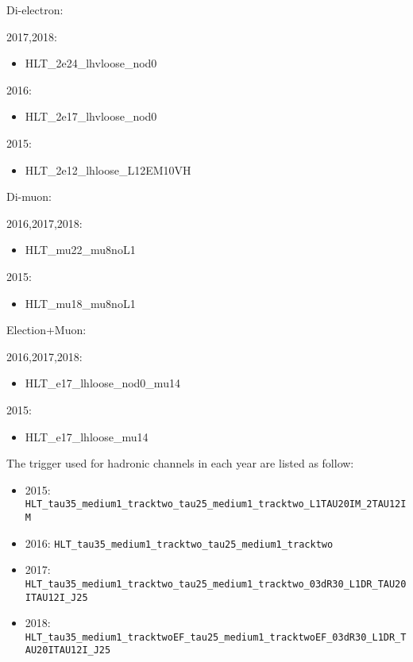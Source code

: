 Di-electron:

2017,2018:
\begin{itemize}
	\item HLT\_2e24\_lhvloose\_nod0
\end{itemize}
2016:
\begin{itemize}
	\item HLT\_2e17\_lhvloose\_nod0
\end{itemize}
2015:
\begin{itemize}
	\item HLT\_2e12\_lhloose\_L12EM10VH
\end{itemize}

Di-muon:

2016,2017,2018:
\begin{itemize}
	\item HLT\_mu22\_mu8noL1
\end{itemize}
2015:
\begin{itemize}
	\item HLT\_mu18\_mu8noL1
\end{itemize}

Election+Muon:

2016,2017,2018:
\begin{itemize}
	\item HLT\_e17\_lhloose\_nod0\_mu14
\end{itemize}
2015:
\begin{itemize}
	\item HLT\_e17\_lhloose\_mu14
\end{itemize}

The trigger used for hadronic channels in each year are listed as follow:
\begin{itemize}

\item 2015: \texttt{HLT\_tau35\_medium1\_tracktwo\_tau25\_medium1\_tracktwo\_L1TAU20IM\_2TAU12IM}
\item 2016: \texttt{HLT\_tau35\_medium1\_tracktwo\_tau25\_medium1\_tracktwo}
\item 2017: \texttt{HLT\_tau35\_medium1\_tracktwo\_tau25\_medium1\_tracktwo\_03dR30\_L1DR\_TAU20ITAU12I\_J25}
\item 2018: \texttt{HLT\_tau35\_medium1\_tracktwoEF\_tau25\_medium1\_tracktwoEF\_03dR30\_L1DR\_TAU20ITAU12I\_J25}

 \end{itemize}

